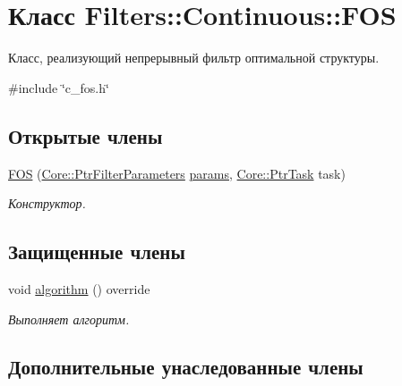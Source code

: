 \hypertarget{class_filters_1_1_continuous_1_1_f_o_s}{}\section{Класс Filters\+:\+:Continuous\+:\+:F\+OS}
\label{class_filters_1_1_continuous_1_1_f_o_s}


Класс, реализующий непрерывный фильтр оптимальной структуры.  




{\ttfamily \#include \char`\"{}c\+\_\+fos.\+h\char`\"{}}

\subsection*{Открытые члены}
\begin{DoxyCompactItemize}
\item 
\hypertarget{class_filters_1_1_continuous_1_1_f_o_s_a37bf6963e1fc25a0a709d53299fc2951}{}\label{class_filters_1_1_continuous_1_1_f_o_s_a37bf6963e1fc25a0a709d53299fc2951} 
\hyperlink{class_filters_1_1_continuous_1_1_f_o_s_a37bf6963e1fc25a0a709d53299fc2951}{F\+OS} (\hyperlink{namespace_core_a4811af8148ba137d644b9a61a042cf03}{Core\+::\+Ptr\+Filter\+Parameters} \hyperlink{class_core_1_1_filter_a44aa749b49ba46256975ce545531ecf7}{params}, \hyperlink{namespace_core_abfda8f69fcacfcea2696549b548ed737}{Core\+::\+Ptr\+Task} task)
\begin{DoxyCompactList}\small\item\em Конструктор. \end{DoxyCompactList}\end{DoxyCompactItemize}
\subsection*{Защищенные члены}
\begin{DoxyCompactItemize}
\item 
void \hyperlink{class_filters_1_1_continuous_1_1_f_o_s_a6db8005b66c345d94cdd4498edad9022}{algorithm} () override
\begin{DoxyCompactList}\small\item\em Выполняет алгоритм. \end{DoxyCompactList}\end{DoxyCompactItemize}
\subsection*{Дополнительные унаследованные члены}


